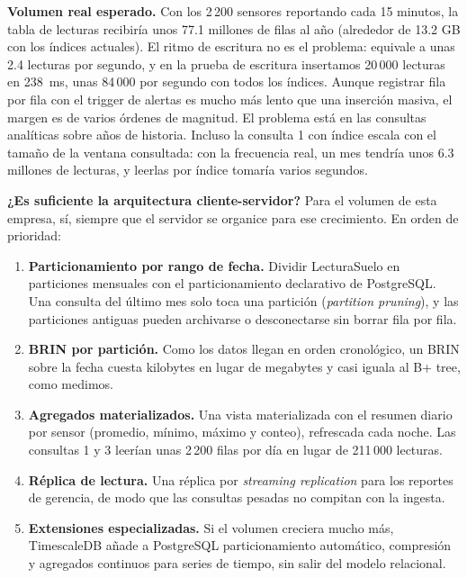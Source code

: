 \documentclass[11pt,letterpaper]{article}
\newcommand{\tbus}{\textunderscore\allowbreak}
\newcommand{\tb}[1]{{\ttfamily\let\_\tbus #1}}
\begin{document}
\textbf{Volumen real esperado.} Con los 2\,200 sensores reportando cada 15 minutos, la tabla de lecturas recibiría unos 77.1 millones de filas al año (alrededor de 13.2 GB con los índices actuales). El ritmo de escritura no es el problema: equivale a unas 2.4 lecturas por segundo, y en la prueba de escritura insertamos 20\,000 lecturas en 238~ms, unas 84\,000 por segundo con todos los índices. Aunque registrar fila por fila con el trigger de alertas es mucho más lento que una inserción masiva, el margen es de varios órdenes de magnitud. El problema está en las consultas analíticas sobre años de historia. Incluso la consulta 1 con índice escala con el tamaño de la ventana consultada: con la frecuencia real, un mes tendría unos 6.3 millones de lecturas, y leerlas por índice tomaría varios segundos.

\textbf{¿Es suficiente la arquitectura cliente-servidor?} Para el volumen de esta empresa, sí, siempre que el servidor se organice para ese crecimiento. En orden de prioridad:

\begin{enumerate}[leftmargin=1.6em,itemsep=0.15em]
\item \textbf{Particionamiento por rango de fecha.} Dividir \tb{Lectura\_Suelo} en particiones mensuales con el particionamiento declarativo de PostgreSQL. Una consulta del último mes solo toca una partición (\emph{partition pruning}), y las particiones antiguas pueden archivarse o desconectarse sin borrar fila por fila.
\item \textbf{BRIN por partición.} Como los datos llegan en orden cronológico, un BRIN sobre la fecha cuesta kilobytes en lugar de megabytes y casi iguala al B+ tree, como medimos.
\item \textbf{Agregados materializados.} Una vista materializada con el resumen diario por sensor (promedio, mínimo, máximo y conteo), refrescada cada noche. Las consultas 1 y 3 leerían unas 2\,200 filas por día en lugar de 211\,000 lecturas.
\item \textbf{Réplica de lectura.} Una réplica por \emph{streaming replication} para los reportes de gerencia, de modo que las consultas pesadas no compitan con la ingesta.
\item \textbf{Extensiones especializadas.} Si el volumen creciera mucho más, TimescaleDB añade a PostgreSQL particionamiento automático, compresión y agregados continuos para series de tiempo, sin salir del modelo relacional.
\end{enumerate}
\end{document}
